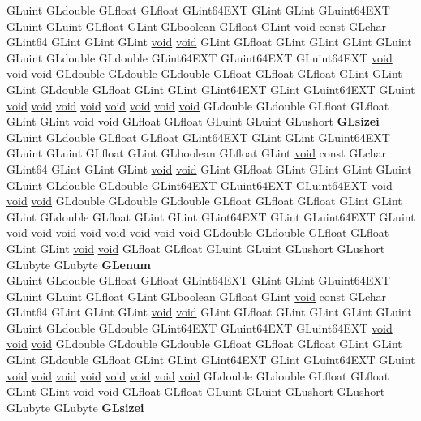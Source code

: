 \begin{DoxyCompactItemize}
\begin{tabbing}
\>GLuint GLdouble GLfloat GLfloat GLint64EXT GLint GLint GLuint64EXT GLuint GLuint GLfloat GLint GLboolean GLfloat GLint \hyperlink{interfacevoid}{void} const GLchar GLint64 GLint GLint GLint \hyperlink{interfacevoid}{void} \hyperlink{interfacevoid}{void} GLint GLfloat GLint GLint GLint GLuint GLuint GLdouble GLdouble GLint64EXT GLuint64EXT GLuint64EXT \hyperlink{interfacevoid}{void} \hyperlink{interfacevoid}{void} \hyperlink{interfacevoid}{void} GLdouble GLdouble GLdouble GLfloat GLfloat GLfloat GLint GLint GLint GLdouble GLfloat GLint GLint GLint64EXT GLint GLuint64EXT GLuint \hyperlink{interfacevoid}{void} \hyperlink{interfacevoid}{void} \hyperlink{interfacevoid}{void} \hyperlink{interfacevoid}{void} \hyperlink{interfacevoid}{void} \hyperlink{interfacevoid}{void} \hyperlink{interfacevoid}{void} \hyperlink{interfacevoid}{void} GLdouble GLdouble GLfloat GLfloat GLint GLint \hyperlink{interfacevoid}{void} \hyperlink{interfacevoid}{void} GLfloat GLfloat GLuint GLuint GLushort {\bfseries GLsizei}\\
\>GLuint GLdouble GLfloat GLfloat GLint64EXT GLint GLint GLuint64EXT GLuint GLuint GLfloat GLint GLboolean GLfloat GLint \hyperlink{interfacevoid}{void} const GLchar GLint64 GLint GLint GLint \hyperlink{interfacevoid}{void} \hyperlink{interfacevoid}{void} GLint GLfloat GLint GLint GLint GLuint GLuint GLdouble GLdouble GLint64EXT GLuint64EXT GLuint64EXT \hyperlink{interfacevoid}{void} \hyperlink{interfacevoid}{void} \hyperlink{interfacevoid}{void} GLdouble GLdouble GLdouble GLfloat GLfloat GLfloat GLint GLint GLint GLdouble GLfloat GLint GLint GLint64EXT GLint GLuint64EXT GLuint \hyperlink{interfacevoid}{void} \hyperlink{interfacevoid}{void} \hyperlink{interfacevoid}{void} \hyperlink{interfacevoid}{void} \hyperlink{interfacevoid}{void} \hyperlink{interfacevoid}{void} \hyperlink{interfacevoid}{void} \hyperlink{interfacevoid}{void} GLdouble GLdouble GLfloat GLfloat GLint GLint \hyperlink{interfacevoid}{void} \hyperlink{interfacevoid}{void} GLfloat GLfloat GLuint GLuint GLushort GLushort GLubyte GLubyte {\bfseries GLenum}\\
\>GLuint GLdouble GLfloat GLfloat GLint64EXT GLint GLint GLuint64EXT GLuint GLuint GLfloat GLint GLboolean GLfloat GLint \hyperlink{interfacevoid}{void} const GLchar GLint64 GLint GLint GLint \hyperlink{interfacevoid}{void} \hyperlink{interfacevoid}{void} GLint GLfloat GLint GLint GLint GLuint GLuint GLdouble GLdouble GLint64EXT GLuint64EXT GLuint64EXT \hyperlink{interfacevoid}{void} \hyperlink{interfacevoid}{void} \hyperlink{interfacevoid}{void} GLdouble GLdouble GLdouble GLfloat GLfloat GLfloat GLint GLint GLint GLdouble GLfloat GLint GLint GLint64EXT GLint GLuint64EXT GLuint \hyperlink{interfacevoid}{void} \hyperlink{interfacevoid}{void} \hyperlink{interfacevoid}{void} \hyperlink{interfacevoid}{void} \hyperlink{interfacevoid}{void} \hyperlink{interfacevoid}{void} \hyperlink{interfacevoid}{void} \hyperlink{interfacevoid}{void} GLdouble GLdouble GLfloat GLfloat GLint GLint \hyperlink{interfacevoid}{void} \hyperlink{interfacevoid}{void} GLfloat GLfloat GLuint GLuint GLushort GLushort GLubyte GLubyte {\bfseries GLsizei}\\

\end{tabbing}
\end{DoxyCompactItemize}
